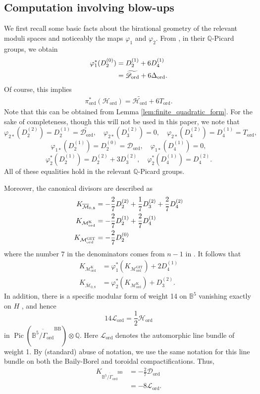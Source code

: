 \documentclass[12pt, pdftex]{amsart}
\theoremstyle{plain}
\theoremstyle{definition}
\numberwithin{equation}{section}
\def\Q{{\mathbb Q}}
\def\B{{\mathbb B}}
\def\Pic{\mathop{\mathrm{Pic}}\nolimits}
\def\ord{\mathrm{ord}}
\def\GIT{\mathrm{GIT}}
\def\K{\mathrm{K}}
\def\BB{\mathrm{BB}}
\def\L{\mathscr{L}}
\def\H{\mathscr{H}}
\def\M{\mathcal{M}}
\def\D{\mathscr{D}}
\begin{document}
\subsection{Computation involving blow-ups}
We first recall some basic facts about the birational geometry of the relevant moduli spaces and noticeably the maps $\varphi_1$ and $\varphi_2$. From \cite[Lemma 5.3]{KM11}, in their $\Q$-Picard groups, we obtain 
\begin{align}
\label{eq:pull_back}
    \varphi_1^{*}(D_2^{(0)})&=D_2^{(1)}+6D_4^{(1)}\\
    &=\widetilde{\D_{\ord}}+6\Delta_{\ord}\notag.
\end{align}
Of course, this implies 
\begin{align}
\label{eq:pull_back_toroidal}
    \pi_{\ord}^{*}(\H_{\ord})=\widetilde{\H_{\ord}}+6T_{\ord}.
\end{align}
Note that this can be obtained from Lemma \ref{lem:finite_quadratic_form}.
For the sake of completeness, though this will not be used in this paper, we note that
\[\varphi_{2*}(D_2^{(2)})=D_2^{(1)}=\widetilde{\D_{\ord}},\quad \varphi_{2*}(D_3^{(2)})=0,\quad \varphi_{2*}(D_4^{(2)})=D_4^{(1)}=T_{\ord},\]
\[\varphi_{1*}(D_2^{(1)})=D_2^{(0)}=\D_{\ord},\quad  \varphi_{1*}(D_4^{(1)})=0,\]
\[\varphi_2^{*}(D_2^{(1)})=D_2^{(2)}+3D_3^{(2)},\quad \varphi_2^{*}(D_4^{(1)})=D_4^{(2)}.\]
All of these equalities hold in the relevant $\Q$-Picard groups.


Moreover, the canonical divisors are described as 
\begin{align}\label{eq:can_bindle_M^K_{ord}}
 K_{\overline{\M}_{0,8}}&=-\frac{2}{7}D^{(2)}_2+\frac{1}{7}D^{(2)}_3+\frac{2}{7}D^{(2)}_4\notag\\
  K_{\M_{\ord}^{\K}}&=-\frac{2}{7}D^{(1)}_2+\frac{2}{7}D^{(1)}_4\\
    K_{\M_{\ord}^{\GIT}}&=-\frac{2}{7}D^{(0)}_2\notag
\end{align}
where the number $7$ in the denominators comes from $n-1$ in \cite[Proposition 5.4, Lemma 5.5]{KM11}.
It follows that 
\begin{align*}
    K_{\M^{\K}_{\ord}}&=\varphi_1^{*}(K_{\M^{\GIT}_{\ord}})+2D_4^{(1)}\\
     K_{\overline{\M}_{0,8}}&=\varphi_2^{*}(K_{\M^{\K}_{\ord}})+D_3^{(2)}.
\end{align*}
In addition,  there is a specific modular form of weight 14 on $\B^5$ vanishing exactly on $H$ \cite[Theorem 6.2]{Ko07a}, and hence 
\begin{equation}\label{eq:Kondoform}
14\L_{\ord}=\frac{1}{2}\H_{\ord}
\end{equation}
in $\Pic(\overline{\B^5/\Gamma_{\ord}}^{\BB})\otimes\Q$.
Here $\L_{\ord}$ denotes the automorphic line bundle of weight 1.
By (standard) abuse of notation, we use the same notation for this line bundle on both the Baily-Borel and toroidal compactifications.
Thus, 
\begin{align*}
    K_{\overline{\B^5/\Gamma_{\ord}}^{\BB}}&=-\frac{2}{7}\D_{\ord}\\
    &=-8\L_{\ord}.
\end{align*}
\end{document}
